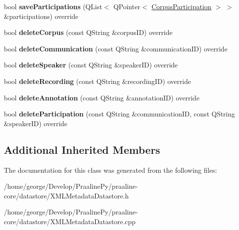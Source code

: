 \begin{DoxyCompactItemize}
\mbox{\label{class_x_m_l_metadata_datastore_acaa676e9c2a2e3c2b329a56ef0def274}} 
bool {\bfseries save\+Participations} (Q\+List$<$ Q\+Pointer$<$ \hyperlink{class_corpus_participation}{Corpus\+Participation} $>$ $>$ \&participations) override
\item 
\mbox{\label{class_x_m_l_metadata_datastore_a9e70a9894d5d1314465d355a6a621773}} 
bool {\bfseries delete\+Corpus} (const Q\+String \&corpus\+ID) override
\item 
\mbox{\label{class_x_m_l_metadata_datastore_ab9431a649e6dad9a79c10e071a9d0bc9}} 
bool {\bfseries delete\+Communication} (const Q\+String \&communication\+ID) override
\item 
\mbox{\label{class_x_m_l_metadata_datastore_a6a93a3b80501e9810cc4adf5aa4e13d3}} 
bool {\bfseries delete\+Speaker} (const Q\+String \&speaker\+ID) override
\item 
\mbox{\label{class_x_m_l_metadata_datastore_aa276e0ff1c91ff02d4a0257c02182fbe}} 
bool {\bfseries delete\+Recording} (const Q\+String \&recording\+ID) override
\item 
\mbox{\label{class_x_m_l_metadata_datastore_ac02458ce94d40914eab4b2958bcdc5d8}} 
bool {\bfseries delete\+Annotation} (const Q\+String \&annotation\+ID) override
\item 
\mbox{\label{class_x_m_l_metadata_datastore_a0abd67013246c7c0f4351b0ee41e7345}} 
bool {\bfseries delete\+Participation} (const Q\+String \&communication\+ID, const Q\+String \&speaker\+ID) override
\end{DoxyCompactItemize}
\subsection*{Additional Inherited Members}


The documentation for this class was generated from the following files\+:\begin{DoxyCompactItemize}
\item 
/home/george/\+Develop/\+Praaline\+Py/praaline-\/core/datastore/X\+M\+L\+Metadata\+Datastore.\+h\item 
/home/george/\+Develop/\+Praaline\+Py/praaline-\/core/datastore/X\+M\+L\+Metadata\+Datastore.\+cpp\end{DoxyCompactItemize}
